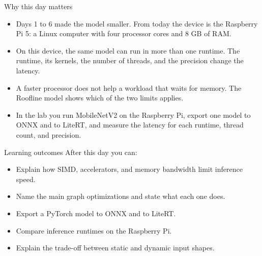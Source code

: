 \begin{frame}{Why this day matters}
  \begin{itemize}
    \item Days 1 to 6 made the model smaller. From today the device is the
          Raspberry Pi 5: a Linux computer with four processor cores and 8 GB
          of RAM.
    \item On this device, the same model can run in more than one runtime. The
          runtime, its kernels, the number of threads, and the precision
          change the latency.
    \item A faster processor does not help a workload that waits for memory.
          The Roofline model shows which of the two limits applies.
    \item In the lab you run MobileNetV2 on the Raspberry Pi, export one model
          to ONNX and to LiteRT, and measure the latency for each runtime,
          thread count, and precision.
  \end{itemize}
\end{frame}

\begin{frame}{Learning outcomes}
  After this day you can:
  \begin{itemize}
    \item Explain how SIMD, accelerators, and memory bandwidth limit inference
          speed.
    \item Name the main graph optimizations and state what each one does.
    \item Export a PyTorch model to ONNX and to LiteRT.
    \item Compare inference runtimes on the Raspberry Pi.
    \item Explain the trade-off between static and dynamic input shapes.
  \end{itemize}
\end{frame}
